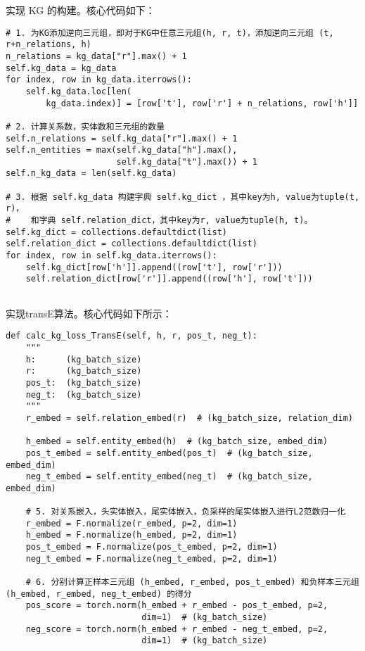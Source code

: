 \documentclass{ctexart}
\begin{document}
\begin{sloppypar}
         实现 KG 的构建。核心代码如下：

        \begin{lstlisting}[style=python]
# 1. 为KG添加逆向三元组，即对于KG中任意三元组(h, r, t)，添加逆向三元组 (t, r+n_relations, h)
n_relations = kg_data["r"].max() + 1
self.kg_data = kg_data
for index, row in kg_data.iterrows():
    self.kg_data.loc[len(
        kg_data.index)] = [row['t'], row['r'] + n_relations, row['h']]

# 2. 计算关系数，实体数和三元组的数量
self.n_relations = self.kg_data["r"].max() + 1
self.n_entities = max(self.kg_data["h"].max(),
                      self.kg_data["t"].max()) + 1
self.n_kg_data = len(self.kg_data)

# 3. 根据 self.kg_data 构建字典 self.kg_dict ，其中key为h, value为tuple(t, r)，
#    和字典 self.relation_dict，其中key为r, value为tuple(h, t)。
self.kg_dict = collections.defaultdict(list)
self.relation_dict = collections.defaultdict(list)
for index, row in self.kg_data.iterrows():
    self.kg_dict[row['h']].append((row['t'], row['r']))
    self.relation_dict[row['r']].append((row['h'], row['t']))
            
        \end{lstlisting}

         实现transE算法。核心代码如下所示：

    \begin{lstlisting}[style=python]
def calc_kg_loss_TransE(self, h, r, pos_t, neg_t):
    """
    h:      (kg_batch_size)
    r:      (kg_batch_size)
    pos_t:  (kg_batch_size)
    neg_t:  (kg_batch_size)
    """
    r_embed = self.relation_embed(r)  # (kg_batch_size, relation_dim)

    h_embed = self.entity_embed(h)  # (kg_batch_size, embed_dim)
    pos_t_embed = self.entity_embed(pos_t)  # (kg_batch_size, embed_dim)
    neg_t_embed = self.entity_embed(neg_t)  # (kg_batch_size, embed_dim)

    # 5. 对关系嵌入，头实体嵌入，尾实体嵌入，负采样的尾实体嵌入进行L2范数归一化
    r_embed = F.normalize(r_embed, p=2, dim=1)
    h_embed = F.normalize(h_embed, p=2, dim=1)
    pos_t_embed = F.normalize(pos_t_embed, p=2, dim=1)
    neg_t_embed = F.normalize(neg_t_embed, p=2, dim=1)

    # 6. 分别计算正样本三元组 (h_embed, r_embed, pos_t_embed) 和负样本三元组 (h_embed, r_embed, neg_t_embed) 的得分
    pos_score = torch.norm(h_embed + r_embed - pos_t_embed, p=2,
                           dim=1)  # (kg_batch_size)
    neg_score = torch.norm(h_embed + r_embed - neg_t_embed, p=2,
                           dim=1)  # (kg_batch_size)


\end{lstlisting}
\end{sloppypar}
\end{document}
